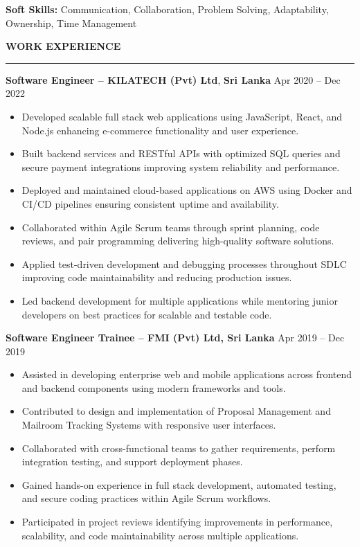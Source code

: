\documentclass[10pt,letterpaper]{article}
\begin{document}
\textbf{Soft Skills:} Communication, Collaboration, Problem Solving, Adaptability, Ownership, Time Management

\vspace{8pt}

\textbf{WORK EXPERIENCE}\\[-8pt]
\noindent\rule{\textwidth}{1pt}

\vspace{-2pt}

\textbf{Software Engineer -- KILATECH (Pvt) Ltd}, \textbf{Sri Lanka} \hfill Apr 2020 -- Dec 2022

\vspace{-1pt}

\begin{itemize}
\item Developed scalable full stack web applications using JavaScript, React, and Node.js enhancing e-commerce functionality and user experience.
\item Built backend services and RESTful APIs with optimized SQL queries and secure payment integrations improving system reliability and performance.
\item Deployed and maintained cloud-based applications on AWS using Docker and CI/CD pipelines ensuring consistent uptime and availability.
\item Collaborated within Agile Scrum teams through sprint planning, code reviews, and pair programming delivering high-quality software solutions.
\item Applied test-driven development and debugging processes throughout SDLC improving code maintainability and reducing production issues.
\item Led backend development for multiple applications while mentoring junior developers on best practices for scalable and testable code.
\end{itemize}

\textbf{Software Engineer Trainee -- FMI (Pvt) Ltd, Sri Lanka} \hfill Apr 2019 -- Dec 2019

\vspace{-1pt}

\begin{itemize}
\item Assisted in developing enterprise web and mobile applications across frontend and backend components using modern frameworks and tools.
\item Contributed to design and implementation of Proposal Management and Mailroom Tracking Systems with responsive user interfaces.
\item Collaborated with cross-functional teams to gather requirements, perform integration testing, and support deployment phases.
\item Gained hands-on experience in full stack development, automated testing, and secure coding practices within Agile Scrum workflows.
\item Participated in project reviews identifying improvements in performance, scalability, and code maintainability across multiple applications.
\end{itemize}
\end{document}

